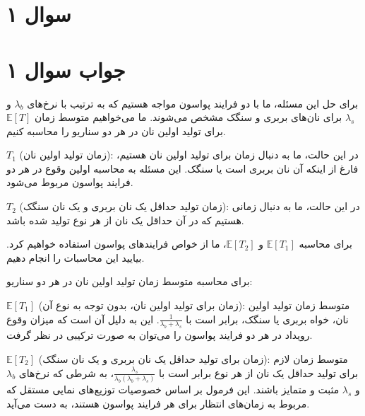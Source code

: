 \section*{سوال ۱}



\section*{جواب سوال ۱}

برای حل این مسئله، ما با دو فرایند پواسون مواجه هستیم که به ترتیب با نرخ‌های \( \lambda_b \) و \( \lambda_s \) برای نان‌های بربری و سنگک مشخص می‌شوند. ما می‌خواهیم متوسط زمان \( \mathbb{E}[T] \) برای تولید اولین نان در هر دو سناریو را محاسبه کنیم.

\( T_1 \) (زمان تولید اولین نان): در این حالت، ما به دنبال زمان برای تولید اولین نان هستیم، فارغ از اینکه آن نان بربری است یا سنگک. این مسئله به محاسبه اولین وقوع در هر دو فرایند پواسون مربوط می‌شود.

\( T_2 \) (زمان تولید حداقل یک نان بربری و یک نان سنگک): در این حالت، ما به دنبال زمانی هستیم که در آن حداقل یک نان از هر نوع تولید شده باشد.

برای محاسبه \( \mathbb{E}[T_1] \) و \( \mathbb{E}[T_2] \)، ما از خواص فرایندهای پواسون استفاده خواهیم کرد. بیایید این محاسبات را انجام دهیم.

برای محاسبه متوسط زمان تولید اولین نان در هر دو سناریو:

\( \mathbb{E}[T_1] \) (زمان برای تولید اولین نان، بدون توجه به نوع آن): متوسط زمان تولید اولین نان، خواه بربری یا سنگک، برابر است با \( \frac{1}{\lambda_b + \lambda_s} \). این به دلیل آن است که میزان وقوع رویداد در هر دو فرایند پواسون را می‌توان به صورت ترکیبی در نظر گرفت.

\( \mathbb{E}[T_2] \) (زمان برای تولید حداقل یک نان بربری و یک نان سنگک): متوسط زمان لازم برای تولید حداقل یک نان از هر نوع برابر است با \( \frac{\lambda_s}{\lambda_b(\lambda_b + \lambda_s)} \)، به شرطی که نرخ‌های \( \lambda_b \) و \( \lambda_s \) مثبت و متمایز باشند. این فرمول بر اساس خصوصیات توزیع‌های نمایی مستقل که مربوط به زمان‌های انتظار برای هر فرایند پواسون هستند، به دست می‌آید.

